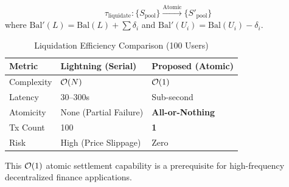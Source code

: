 $$ \tau_{\mathrm{liquidate}}: \{S_{\mathrm{pool}}\} \xrightarrow{\text{Atomic}} \{S'_{\mathrm{pool}}\} $$
where $\mathrm{Bal}'(L) = \mathrm{Bal}(L) + \sum \delta_i$ and $\mathrm{Bal}'(U_i) = \mathrm{Bal}(U_i) - \delta_i$.

\begin{table}[htbp]
\centering
\caption{Liquidation Efficiency Comparison (100 Users)}
\label{tab:liquidation}
\small
\begin{tabularx}{\linewidth}{@{}lXX@{}}
\toprule
\textbf{Metric} & \textbf{Lightning (Serial)} & \textbf{Proposed (Atomic)} \\
\midrule
Complexity & $\mathcal{O}(N)$ & $\mathcal{O}(1)$ \\
Latency & 30--300s & Sub-second \\
Atomicity & None (Partial Failure) & \textbf{All-or-Nothing} \\
Tx Count & 100 & \textbf{1} \\
Risk & High (Price Slippage) & Zero \\
\bottomrule
\end{tabularx}
\end{table}

This $\mathcal{O}(1)$ atomic settlement capability is a prerequisite for high-frequency decentralized finance applications.
